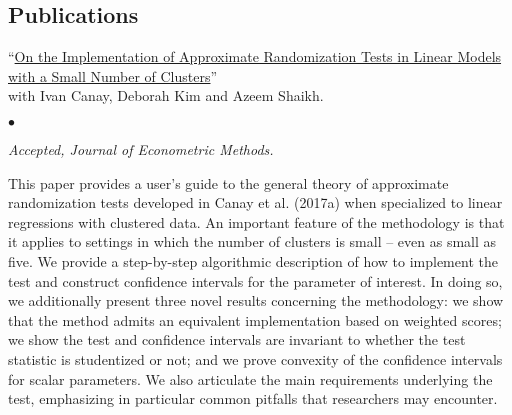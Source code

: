 \documentclass[margin,line]{res}
\newenvironment{list1}{
  \begin{list}{\ding{113}}{%
      \setlength{\itemsep}{.025in}
      \setlength{\parsep}{0in} \setlength{\parskip}{0in}
      \setlength{\topsep}{0in} \setlength{\partopsep}{0in}
      \setlength{\leftmargin}{0.17in}}}{\end{list}}
\newenvironment{list2}{
  \begin{list}{$\bullet$}{%
      \setlength{\itemsep}{0in}
      \setlength{\parsep}{0in} \setlength{\parskip}{0in}
      \setlength{\topsep}{0in} \setlength{\partopsep}{0in}
      \setlength{\leftmargin}{0.2in}}}{\end{list}}
\begin{document}
\begin{resume}
\section{Publications}
\begin{list1}
\item[] ``\href{https://www.degruyter.com/document/doi/10.1515/jem-2021-0030/html}{On the Implementation of Approximate Randomization Tests in Linear Models with a Small Number of Clusters}'' \\
with Ivan Canay, Deborah Kim and Azeem Shaikh.
	\begin{list2}
		\item[] \emph{Accepted, Journal of Econometric Methods.}
		\item[] This paper provides a user's guide to the general theory of approximate randomization tests developed in Canay et al. (2017a) when specialized to linear regressions with clustered data. An important feature of the methodology is that it applies to settings in which the number of clusters is small -- even as small as five. We provide a step-by-step algorithmic description of how to implement the test and construct confidence intervals for the parameter of interest. In doing so, we additionally present three novel results concerning the methodology: we show that the method admits an equivalent implementation based on weighted scores; we show the test and confidence intervals are invariant to whether the test statistic is studentized or not; and we prove convexity of the confidence intervals for scalar parameters. We also articulate the main requirements underlying the test, emphasizing in particular common pitfalls that researchers may encounter. 
	\end{list2}
\end{list1}



\end{resume}
\end{document}
